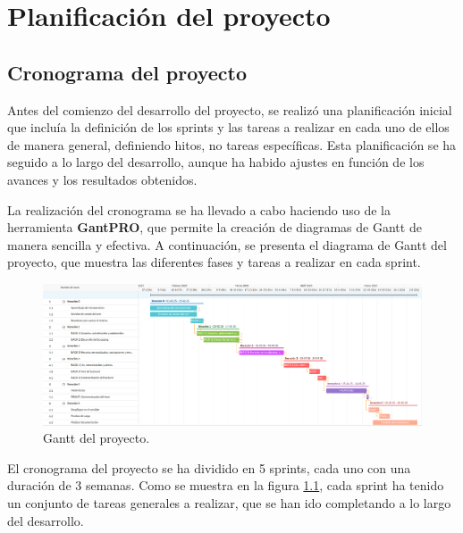 \chapter{Planificación del proyecto}\label{cap:planificacion}

\section{Cronograma del proyecto}

Antes del comienzo del desarrollo del proyecto, se realizó una planificación inicial que incluía la definición de los sprints y las tareas a realizar en cada uno de ellos de manera general, definiendo hitos, no tareas específicas. Esta planificación se ha seguido a lo largo del desarrollo, aunque ha habido ajustes en función de los avances y los resultados obtenidos.

La realización del cronograma se ha llevado a cabo haciendo uso de la herramienta \textbf{GantPRO}\cite{webGanttPro}, que permite la creación de diagramas de Gantt de manera sencilla y efectiva. A continuación, se presenta el diagrama de Gantt del proyecto, que muestra las diferentes fases y tareas a realizar en cada sprint.

\begin{figure}[ht!] 
    \centering 
    \includegraphics[width=1\textwidth]{figures/04_gantt.png}
    \caption{Gantt del proyecto.} 
    \label{gantt}
\end{figure}

El cronograma del proyecto se ha dividido en 5 sprints, cada uno con una duración de 3 semanas. Como se muestra en la figura \ref{gantt}, cada sprint ha tenido un conjunto de tareas generales a realizar, que se han ido completando a lo largo del desarrollo.


